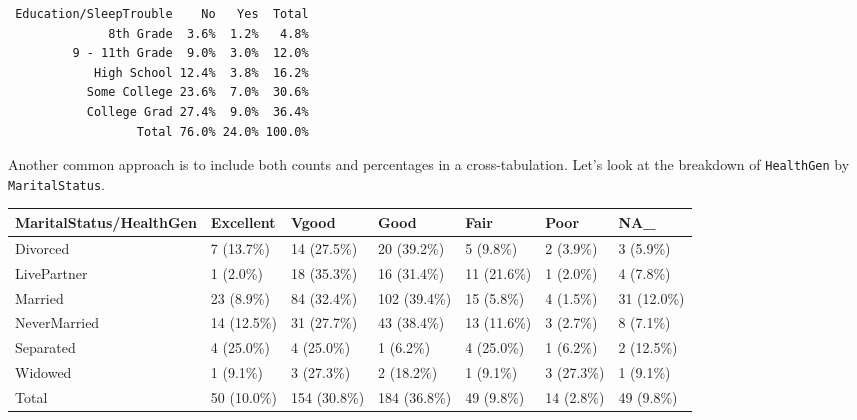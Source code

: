 \documentclass[
]{book}
\newenvironment{Shaded}{\begin{snugshade}}{\end{snugshade}}
\newcommand{\DataTypeTok}[1]{\textcolor[rgb]{0.13,0.29,0.53}{#1}}
\newcommand{\KeywordTok}[1]{\textcolor[rgb]{0.13,0.29,0.53}{\textbf{#1}}}
\newcommand{\NormalTok}[1]{#1}
\newcommand{\OperatorTok}[1]{\textcolor[rgb]{0.81,0.36,0.00}{\textbf{#1}}}
\newcommand{\StringTok}[1]{\textcolor[rgb]{0.31,0.60,0.02}{#1}}
\begin{document}
\begin{verbatim}
 Education/SleepTrouble    No   Yes  Total
              8th Grade  3.6%  1.2%   4.8%
         9 - 11th Grade  9.0%  3.0%  12.0%
            High School 12.4%  3.8%  16.2%
           Some College 23.6%  7.0%  30.6%
           College Grad 27.4%  9.0%  36.4%
                  Total 76.0% 24.0% 100.0%
\end{verbatim}

Another common approach is to include both counts and percentages in a cross-tabulation. Let's look at the breakdown of \texttt{HealthGen} by \texttt{MaritalStatus}.

\begin{Shaded}
\end{Shaded}

\begin{tabular}{l|l|l|l|l|l|l}
\hline
MaritalStatus/HealthGen & Excellent & Vgood & Good & Fair & Poor & NA\_\\
\hline
Divorced & 7 (13.7\%) & 14 (27.5\%) & 20 (39.2\%) & 5  (9.8\%) & 2  (3.9\%) & 3  (5.9\%)\\
\hline
LivePartner & 1  (2.0\%) & 18 (35.3\%) & 16 (31.4\%) & 11 (21.6\%) & 1  (2.0\%) & 4  (7.8\%)\\
\hline
Married & 23  (8.9\%) & 84 (32.4\%) & 102 (39.4\%) & 15  (5.8\%) & 4  (1.5\%) & 31 (12.0\%)\\
\hline
NeverMarried & 14 (12.5\%) & 31 (27.7\%) & 43 (38.4\%) & 13 (11.6\%) & 3  (2.7\%) & 8  (7.1\%)\\
\hline
Separated & 4 (25.0\%) & 4 (25.0\%) & 1  (6.2\%) & 4 (25.0\%) & 1  (6.2\%) & 2 (12.5\%)\\
\hline
Widowed & 1  (9.1\%) & 3 (27.3\%) & 2 (18.2\%) & 1  (9.1\%) & 3 (27.3\%) & 1  (9.1\%)\\
\hline
Total & 50 (10.0\%) & 154 (30.8\%) & 184 (36.8\%) & 49  (9.8\%) & 14  (2.8\%) & 49  (9.8\%)\\
\hline
\end{tabular}
\end{document}
